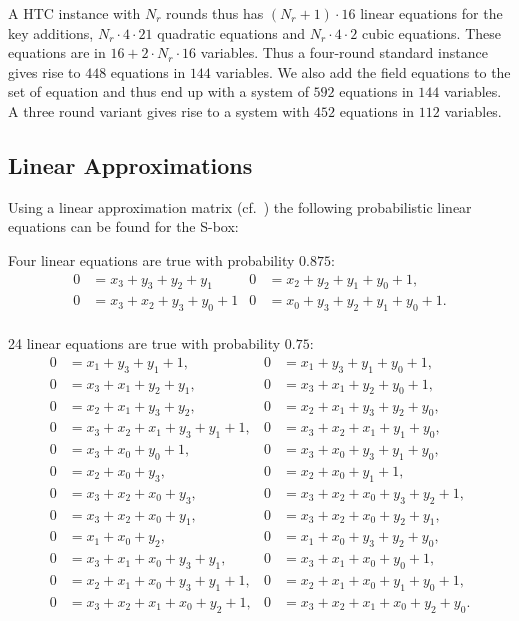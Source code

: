 A HTC instance with $N_r$ rounds thus has $(N_r + 1) \cdot 16$ linear equations for the key additions, $N_r \cdot 4
\cdot 21$ quadratic equations and $N_r \cdot 4 \cdot 2$ cubic equations. These equations are in $16 + 2 \cdot N_r \cdot
16$ variables. Thus a four-round standard instance gives rise to $448$ equations in $144$ variables. We also add the
field equations to the set of equation and thus end up with a system of $592$ equations in $144$ variables. A three
round variant gives rise to a system with $452$ equations in $112$ variables.

\subsection{Linear Approximations}
Using a linear approximation matrix (cf.~\cite{Heys2002}) the following probabilistic linear equations can be found for the S-box:

Four linear equations are true with probability $0.875$:
\begin{align*}
0 &= x_{3} + y_{3} + y_{2} + y_{1} & 0 &= x_{2} + y_{2} + y_{1} + y_{0} + 1,\\
0 &= x_{3} + x_{2} + y_{3} + y_{0} + 1 & 0 &= x_{0} + y_{3} + y_{2} + y_{1} + y_{0} + 1.\\
\end{align*}

24 linear equations are true with probability $0.75$:
\begin{align*}
0 &= x_{1} + y_{3} + y_{1} + 1, & 0 &= x_{1} + y_{3} + y_{1} + y_{0} + 1,\\
0 &= x_{3} + x_{1} + y_{2} + y_{1}, & 0 &= x_{3} + x_{1} + y_{2} + y_{0} + 1,\\
0 &= x_{2} + x_{1} + y_{3} + y_{2}, & 0 &= x_{2} + x_{1} + y_{3} + y_{2} + y_{0},\\
0 &= x_{3} + x_{2} + x_{1} + y_{3} + y_{1} + 1, & 0 &= x_{3} + x_{2} + x_{1} + y_{1} + y_{0},\\
0 &= x_{3} + x_{0} + y_{0} + 1, & 0 &= x_{3} + x_{0} + y_{3} + y_{1} + y_{0},\\
0 &= x_{2} + x_{0} + y_{3}, & 0 &= x_{2} + x_{0} + y_{1} + 1,\\
0 &= x_{3} + x_{2} + x_{0} + y_{3}, & 0 &= x_{3} + x_{2} + x_{0} + y_{3} + y_{2} + 1,\\
0 &= x_{3} + x_{2} + x_{0} + y_{1}, & 0 &= x_{3} + x_{2} + x_{0} + y_{2} + y_{1},\\
0 &= x_{1} + x_{0} + y_{2}, & 0 &= x_{1} + x_{0} + y_{3} + y_{2} + y_{0},\\
0 &= x_{3} + x_{1} + x_{0} + y_{3} + y_{1}, & 0 &= x_{3} + x_{1} + x_{0} + y_{0} + 1,\\
0 &= x_{2} + x_{1} + x_{0} + y_{3} + y_{1} + 1, & 0 &= x_{2} + x_{1} + x_{0} + y_{1} + y_{0} + 1,\\
0 &= x_{3} + x_{2} + x_{1} + x_{0} + y_{2} + 1, & 0 &= x_{3} + x_{2} + x_{1} + x_{0} + y_{2} + y_{0}.
\end{align*}


